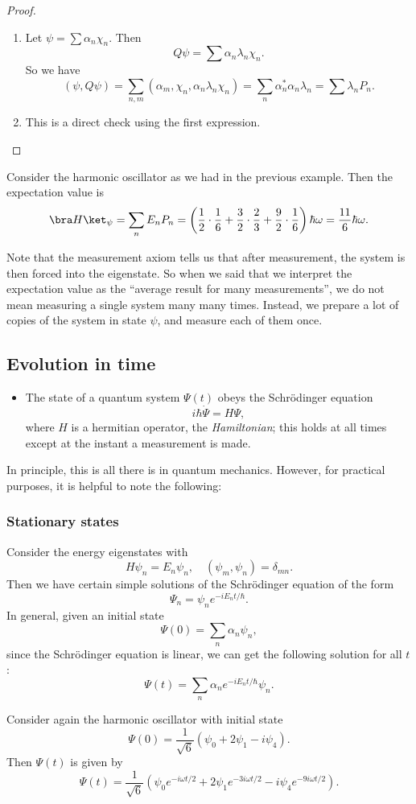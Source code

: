 \documentclass[a4paper]{article}
\begin{document}
\begin{proof}\leavevmode
  \begin{enumerate}
    \item Let $\psi = \sum \alpha_n \chi_n$. Then
      \[
        Q \psi = \sum \alpha_n \lambda_n \chi_n.
      \]
      So we have
      \[
        (\psi, Q\psi) = \sum_{n, m}(\alpha_m, \chi_n, \alpha_n \lambda_n \chi_n) = \sum_n \alpha_n^* \alpha_n \lambda_n = \sum \lambda_n P_n.
      \]
    \item This is a direct check using the first expression.
  \end{enumerate}
\end{proof}

\begin{eg}
  Consider the harmonic oscillator as we had in the previous example. Then the expectation value is
  \[
    \bra H\ket_\psi = \sum_n E_n P_n = \left(\frac{1}{2} \cdot \frac{1}{6} + \frac{3}{2} \cdot \frac{2}{3} + \frac{9}{2}\cdot \frac{1}{6}\right)\hbar \omega = \frac{11}{6}\hbar \omega.
  \]
\end{eg}
Note that the measurement axiom tells us that after measurement, the system is then forced into the eigenstate. So when we said that we interpret the expectation value as the ``average result for many measurements'', we do not mean measuring a single system many many times. Instead, we prepare a lot of copies of the system in state $\psi$, and measure each of them once.

\subsection{Evolution in time}
\begin{itemize}
  \item The state of a quantum system $\Psi(t)$ obeys the Schr\"odinger equation
    \[
      i\hbar \dot{\Psi} = H\Psi,
    \]
    where $H$ is a hermitian operator, the \emph{Hamiltonian}; this holds at all times except at the instant a measurement is made.
\end{itemize}
In principle, this is all there is in quantum mechanics. However, for practical purposes, it is helpful to note the following:

\subsubsection*{Stationary states}
Consider the energy eigenstates with
\[
  H\psi_n = E_n \psi_n,\quad (\psi_m, \psi_n) = \delta_{mn}.
\]
Then we have certain simple solutions of the Schr\"odinger equation of the form
\[
  \Psi_n = \psi_n e^{-iE_n t/\hbar}.
\]
In general, given an initial state
\[
  \Psi(0) = \sum_n \alpha_n \psi_n,
\]
since the Schr\"odinger equation is linear, we can get the following solution for all $t$:
\[
  \Psi(t) = \sum_n \alpha_n e^{-iE_n t/\hbar} \psi_n.
\]
\begin{eg}
  Consider again the harmonic oscillator with initial state
  \[
    \Psi(0) = \frac{1}{\sqrt{6}}(\psi_0 + 2\psi_1 - i \psi_4).
  \]
  Then $\Psi(t)$ is given by
  \[
    \Psi(t) = \frac{1}{\sqrt{6}} (\psi_0 e^{-i\omega t/2} + 2\psi_1e^{-3i\omega t/2} - i \psi_4 e^{-9i\omega t/2}).
  \]
\end{eg}
\end{document}
